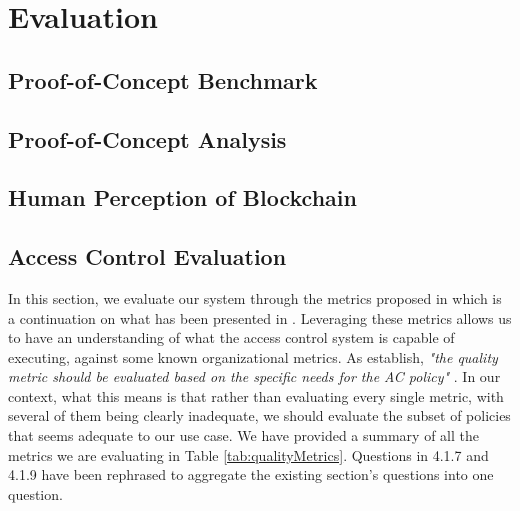 \chapter{Evaluation}
\label{chap:evaluation}

\section{Proof-of-Concept Benchmark}
\label{sec:eval-benchmark}

\section{Proof-of-Concept Analysis}

\section{Human Perception of Blockchain}

\section{Access Control Evaluation}

In this section, we evaluate our system through the metrics proposed in \cite{hu_guidelines_2012} which is a continuation on what has been presented in \cite{hu_assessment_2006}. Leveraging these metrics allows us to have an understanding of what the access control system is capable of executing, against some known organizational metrics. As \citeauthor{hu_guidelines_2012} \cite{hu_guidelines_2012} establish, \emph{"the quality metric should be evaluated based on the specific needs for the AC policy"} \cite[25]{hu_guidelines_2012}. In our context, what this means is that rather than evaluating every single metric, with several of them being clearly inadequate, we should evaluate the subset of policies that seems adequate to our use case. We have provided a summary of all the metrics we are evaluating in Table \ref{tab:qualityMetrics}. Questions in 4.1.7 and 4.1.9 have been rephrased to aggregate the existing section's questions into one question.

